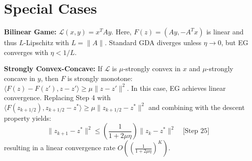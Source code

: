 \documentclass{article}
\begin{document}
\section*{Special Cases}
\textbf{Bilinear Game:} $\mathcal{L}(x, y) = x^T A y$. Here, $F(z) = (Ay, -A^T x)$ is linear and thus $L$-Lipschitz with $L = \|A\|$. Standard GDA diverges unless $\eta \to 0$, but EG converges with $\eta < 1/L$.

\textbf{Strongly Convex-Concave:} If $\mathcal{L}$ is $\mu$-strongly convex in $x$ and $\mu$-strongly concave in $y$, then $F$ is strongly monotone: $\langle F(z) - F(z'), z - z' \rangle \geq \mu \|z - z'\|^2$. In this case, EG achieves linear convergence. Replacing Step 4 with $\langle F(z_{k+1/2}), z_{k+1/2} - z^* \rangle \geq \mu \|z_{k+1/2} - z^*\|^2$ and combining with the descent property yields:
$$
\|z_{k+1} - z^*\|^2 \leq \left( \frac{1}{1 + 2\mu\eta} \right) \|z_k - z^*\|^2 \quad \text{[Step 25]}
$$
resulting in a linear convergence rate $O\left( \left(\frac{1}{1+2\mu\eta}\right)^K \right)$.
\end{document}
